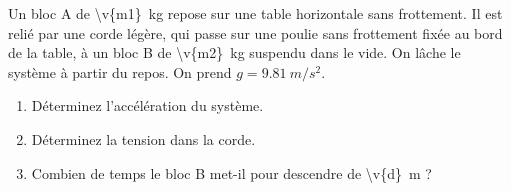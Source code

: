Un bloc A de \qty{\v{m1}}{kg} repose sur une table horizontale sans frottement. Il est relié par une corde légère, qui passe sur une poulie sans frottement fixée au bord de la table, à un bloc B de \qty{\v{m2}}{kg} suspendu dans le vide. On lâche le système à partir du repos. On prend $g = \qty{9.81}{m/s^2}$.

\begin{center}
\end{center}

\begin{enumerate}[label=\alph*)]
    \item Déterminez l'accélération du système.
    \item Déterminez la tension dans la corde.
    \item Combien de temps le bloc B met-il pour descendre de \qty{\v{d}}{m} ?
\end{enumerate}
